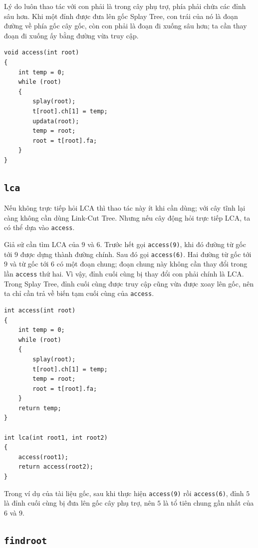 \documentclass[11pt]{article}
\begin{document}
Lý do luôn thao tác với con phải là trong cây phụ trợ, phía phải chứa các đỉnh
sâu hơn.  Khi một đỉnh được đưa lên gốc Splay Tree, con trái của nó là đoạn
đường về phía gốc cây gốc, còn con phải là đoạn đi xuống sâu hơn; ta cần thay
đoạn đi xuống ấy bằng đường vừa truy cập.

\begingroup
\small
\begin{verbatim}
void access(int root)
{
    int temp = 0;
    while (root)
    {
        splay(root);
        t[root].ch[1] = temp;
        updata(root);
        temp = root;
        root = t[root].fa;
    }
}
\end{verbatim}
\endgroup

\subsection{\texttt{lca}}

Nếu không trực tiếp hỏi LCA thì thao tác này ít khi cần dùng; với cây tĩnh lại
càng không cần dùng Link-Cut Tree.  Nhưng nếu cây động hỏi trực tiếp LCA, ta có
thể dựa vào \texttt{access}.

Giả sử cần tìm LCA của $9$ và $6$.  Trước hết gọi \texttt{access(9)}, khi đó
đường từ gốc tới $9$ được dựng thành đường chính.  Sau đó gọi
\texttt{access(6)}.  Hai đường từ gốc tới $9$ và từ gốc tới $6$ có một đoạn
chung; đoạn chung này không cần thay đổi trong lần \texttt{access} thứ hai.
Vì vậy, đỉnh cuối cùng bị thay đổi con phải chính là LCA.  Trong Splay Tree,
đỉnh cuối cùng được truy cập cũng vừa được xoay lên gốc, nên ta chỉ cần trả về
biến tạm cuối cùng của \texttt{access}.

\begingroup
\small
\begin{verbatim}
int access(int root)
{
    int temp = 0;
    while (root)
    {
        splay(root);
        t[root].ch[1] = temp;
        temp = root;
        root = t[root].fa;
    }
    return temp;
}

int lca(int root1, int root2)
{
    access(root1);
    return access(root2);
}
\end{verbatim}
\endgroup

Trong ví dụ của tài liệu gốc, sau khi thực hiện \texttt{access(9)} rồi
\texttt{access(6)}, đỉnh $5$ là đỉnh cuối cùng bị đưa lên gốc cây phụ trợ, nên
$5$ là tổ tiên chung gần nhất của $6$ và $9$.

\subsection{\texttt{findroot}}
\end{document}
